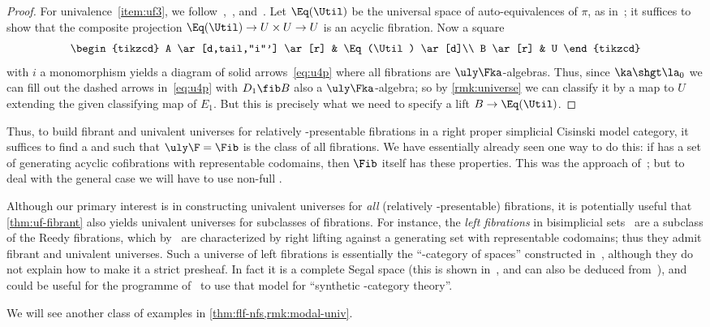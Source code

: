 \begin{proof}
  For univalence~\ref{item:uf3}, we follow~\cite[Theorem 3.4.1]{klv:ssetmodel},~\cite[]{shulman:elreedy}, and~\cite[Theorem 3.12]{cisinski:elegant}.
  Let $\Eq(\Util)$ be the universal space of auto-equivalences of $\pi$, as in~\cite[]{shulman:elreedy}; it suffices to show that the composite projection
  \(\Eq(\Util) \to U\times U \to U\)
  is an acyclic fibration.
  Now a square
  \[
    \begin{tikzcd}
      A \ar[d,tail,"i"'] \ar[r] & \Eq(\Util) \ar[d]\\
      B \ar[r] & U
    \end{tikzcd}
  \]
  with $i$ a monomorphism yields a diagram of solid arrows~\eqref{eq:u4p} where all fibrations are $\uly\Fka$-algebras.
  Thus, since $\ka\shgt\la_0$ we can fill out the dashed arrows in~\eqref{eq:u4p} with $D_1 \fib B$ also a $\uly\Fka$-algebra; so by \cref{rmk:universe} we can classify it by a map to $U$ extending the given classifying map of $E_1$.
  But this is precisely what we need to specify a lift $B\to \Eq(\Util)$.
\end{proof}

Thus, to build fibrant and univalent universes for relatively \ka-presentable fibrations in a right proper simplicial Cisinski model category, it suffices to find a \local and \stratified \nfs \F such that $\uly\F=\Fib$ is the class of all fibrations.
We have essentially already seen one way to do this: if \E has a set of generating acyclic cofibrations with representable codomains, then $\Fib$ itself has these properties.
This was the approach of~\cite{klv:ssetmodel,shulman:elreedy}; but to deal with the general case we will have to use non-full \nfss.

\begin{rmk}
  Although our primary interest is in constructing univalent universes for \emph{all} (relatively \ka-presentable) fibrations, it is potentially useful that \cref{thm:uf-fibrant} also yields univalent universes for subclasses of fibrations.
  For instance, the \emph{left fibrations} in bisimplicial sets~\cite{vk:yoneda-css,pbb:groth-segal,rasekh:yoneda-ss} are a subclass of the Reedy fibrations, which by~\cite[Remark 2.1.4(a)]{vk:yoneda-css} are characterized by right lifting against a generating set with representable codomains; thus they admit fibrant and univalent universes.
  Such a universe of left fibrations is essentially the ``\oo-category of spaces'' constructed in~\cite{vk:yoneda-css}, although they do not explain how to make it a strict presheaf.
  In fact it is a complete Segal space (this is shown in~\cite[Theorem 2.2.11]{vk:yoneda-css}, and can also be deduced from~\cite[Theorem 4.8]{rasekh:yoneda-ss}), and could be useful for the programme of~\cite{rs:stt} to use that model for ``synthetic \io-category theory''.
  
  We will see another class of examples in \cref{thm:flf-nfs,rmk:modal-univ}.
\end{rmk}


